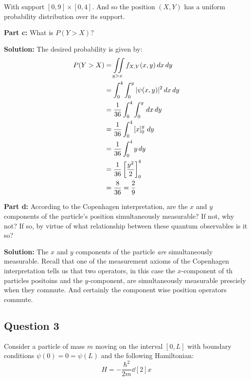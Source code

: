 \documentclass{article}
\renewcommand{\eval}[3]{\left[#1\right]_{#2}^{#3}}
\begin{document}
With support $[0,9]\times[0,4]$. And so the position $(X,Y)$ has a uniform probability distribution over its support.
\bigskip

\noindent\textbf{Part c:} What is $P(Y>X)$?
\bigskip

\noindent\textbf{Solution:} The desired probability is given by:
\begin{align*}
    P(Y>X)&=\iint\displaylimits_{y>x}f_{X,Y}(x,y)\,dx\,dy\\
    &=\int_0^4\int_0^y|\psi(x,y)|^2\,dx\,dy\\
    &=\frac{1}{36}\int_0^4\int_0^y\,dx\,dy\\
    &=\frac{1}{36}\int_0^4\eval{x}{0}{y}\,dy\\
    &=\frac{1}{36}\int_0^4y\,dy\\
    &=\frac{1}{36}\eval{\frac{y^2}{2}}{0}{4}\\
    &=\frac{8}{36}=\frac{2}{9}
\end{align*}
\bigskip

\noindent\textbf{Part d:} According to the Copenhagen interpretation, are the $x$ and $y$ components of the particle's position simultaneously measurable? If not, why not? If so, by virtue of what relationship between these quantum observables is it so?
\bigskip

\noindent\textbf{Solution:} The $x$ and $y$ components of the particle \textit{are} simultaneously measurable. Recall that one of the measurement axioms of the Copenhagen interpretation tells us that two operators, in this case the $x$-component of th particles positoins and the $y$-component, are simultaneously measurable presciely when they commute. And certainly the component wise position operators commute.

\newpage

\subsection*{Question 3}
Consider a particle of mass $m$ moving on the interval $[0,L]$ with boundary conditions $\psi(0)=0=\psi(L)$ and the following Hamiltonian:
$$H=-\frac{\hbar^2}{2m}\dd[2]{x}$$
\end{document}
